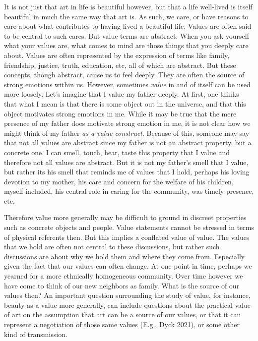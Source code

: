 \documentclass[12pt]{book}
\theoremstyle{definition}
\theoremstyle{remark}
\begin{document}
It is not just that art in life is beautiful however, but that a life well-lived is itself beautiful in much the same way that art is. As such, we care, or have reasons to care about what contributes to having lived a beautiful life. Values are often said to be central to such cares. But value terms are abstract. When you ask yourself what your values are, what comes to mind are those things that you deeply care about. Values are often represented by the expression of terms like family, friendship, justice, truth, education, etc, all of which are abstract. But these concepts, though abstract, cause us to feel deeply. They are often the source of strong emotions within us. However, sometimes \emph{value} in and of itself can be used more loosely. Let's imagine that I value my father deeply. At first, one thinks that what I mean is that there is some object out in the universe, and that this object motivates strong emotions in me. While it may be true that the mere presence of my father does motivate strong emotion in me, it is not clear how we might think of my father \emph{as a value construct}. Because of this, someone may say that not all values are abstract since my father is not an abstract property, but a concrete one. I can smell, touch, hear, taste this property that I value and therefore not all values are abstract. But it is not my father's smell that I value, but rather its his smell that reminds me of values that I hold, perhaps his loving devotion to my mother, his care and concern for the welfare of his children, myself included, his central role in caring for the community, was timely presence, etc.

Therefore value more generally may be difficult to ground in discreet properties such as concrete objects and people. Value statements cannot be stressed in terms of physical referents then. But this implies a conflated value of value. The values that we hold are often not central to these discussions, but rather such discussions are about why we hold them and where they come from. Especially given the fact that our values can often change. At one point in time, perhaps we yearned for a more ethnically homogeneous community. Over time however we have come to think of our new neighbors as family. What is the source of our values then? An important question surrounding the study of value, for instance, beauty as a value more generally, can include questions about the practical value of art on the assumption that art can be a source of our values, or that it can represent a negotiation of those same values (E.g., Dyck 2021), or some other kind of transmission.
\end{document}

